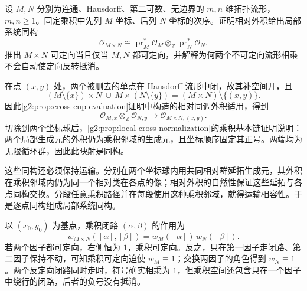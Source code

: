 \begin{exercise}\label{g2:ex:product-orientation-system}
	设 \(M,N\) 分别为连通、Hausdorff、第二可数、无边界的 \(m,n\) 维拓扑流形，\(m,n\geq1\)。固定乘积中先列 \(M\) 坐标、后列 \(N\) 坐标的次序。证明相对外积给出局部系统同构
	\[
		\mathcal O_{M\times N}\cong
		\operatorname{pr}_M^*\mathcal O_M\otimes_{\mathbb Z}\operatorname{pr}_N^*\mathcal O_N.
	\]
	推出 \(M\times N\) 可定向当且仅当 \(M,N\) 都可定向，并解释为何两个不可定向流形相乘不会自动使定向反转抵消。
\end{exercise}
\begin{solution}
	在点 \((x,y)\) 处，两个被删去的单点在 Hausdorff 流形中闭，故其补空间开，且
	\[
		(M\setminus\{x\})\times N\ \cup\ M\times(N\setminus\{y\})
		=(M\times N)\setminus\{(x,y)\}.
	\]
	因此\cref{g2:prop:cross-cup-evaluation}证明中构造的相对同调外积适用，得到
	\[
		\mathcal O_{M,x}\otimes_{\mathbb Z}\mathcal O_{N,y}
		\longrightarrow\mathcal O_{M\times N,(x,y)}.
	\]
	切除到两个坐标球后，\cref{g2:prop:local-cross-normalization}的乘积基本链证明说明：两个局部生成元的外积仍为乘积邻域的生成元，且坐标顺序固定其正号。两端均为无限循环群，因此此映射是同构。

	这些同构还必须保持运输。分别在两个坐标球内用共同相对群延拓生成元，其外积在乘积邻域内仍为同一个相对类在各点的像；相对外积的自然性保证这些延拓与各点同构交换。分段任意乘积路径并在每段使用这种乘积邻域，就得运输相容性。于是逐点同构组成局部系统同构。

	以 \((x_0,y_0)\) 为基点，乘积闭路 \((\alpha,\beta)\) 的作用为
	\[
		w_{M\times N}([\alpha],[\beta])=w_M([\alpha])\,w_N([\beta]).
	\]
	若两个因子都可定向，右侧恒为 \(1\)，乘积可定向。反之，只在第一因子走闭路、第二因子保持不动，可知乘积可定向迫使 \(w_M\equiv1\)；交换两因子的角色得到 \(w_N\equiv1\)。两个反定向闭路同时走时，符号确实相乘为 \(1\)，但乘积空间还包含只在一个因子中绕行的闭路，后者的负号没有抵消。
\end{solution}

